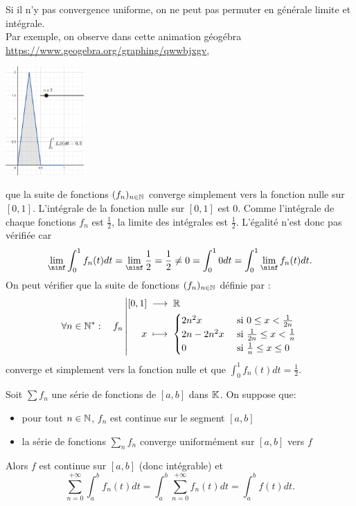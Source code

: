 \documentclass{book}
\newcommand{\fn}{(f_n)_{n\in \N   }}
\newcommand{\Sfn}{\sum f_n}
\begin{document}
\begin{Remarque}
Si il n'y pas convergence uniforme, on ne peut pas permuter en générale limite et intégrale. \\
Par exemple, on observe dans cette animation géogébra \url{https://www.geogebra.org/graphing/qwwbjxgv},
 \begin{center}\includegraphics[width=3cm]{contre_exemple_limite_integrale.png}\end{center} que la suite de fonctions $\fn$ converge simplement vers la fonction nulle sur $[0,1]$. L'intégrale de la fonction nulle sur $[0,1]$ est $0$. Comme l'intégrale de chaque fonctions $f_n$ est $\frac 1 2$, la limite des intégrales est $\frac 1 2$. L'égalité n'est donc pas vérifiée car $$ \lim_\ninf \int_0^1 f_n(t)dt =  \lim_\ninf \frac 1 2 = \frac 1 2 \neq 0  = \int_0^1 0dt= \int_0^1 \lim_\ninf f_n(t)dt.$$
On peut vérifier que la suite de fonctions $\fn$ définie par :
$$\forall n \in \mathbb{N}^* :\quad  {f_n}\left|\begin{aligned}{[0,1]}&\;\longrightarrow\;{\mathbb{R}}\\{x}&\;\longmapsto\;{\begin{cases}2n^2x&\text{ si } 0\leq x < \frac{1}{2n}\\2n-2n^2x&\text{ si } \frac{1}{2n}\leq x < \frac{1}{n}  \\0&\text{ si } \frac{1}{n}\leq x \leq 0 \end{cases}}\end{aligned}\right.$$ converge et simplement vers la fonction nulle et que  $\int_0^1 f_n(t)dt = \frac 1 2$. 
\end{Remarque}
\begin{Theoreme}
Soit $\Sfn$ une série de fonctions de $[a,b]$ dans $\mathbb{K}  $.
On suppose que:
\begin{itemize}
\item
  pour tout $n\in \mathbb{N}   $, $f_n$ est continue sur le segment $[a,b]$
\item
  la série de fonctions $\sum _n f_n$ converge uniformément sur $[a,b]$ vers $f$
\end{itemize}
Alors $f$ est continue sur $[a,b]$ (donc intégrable) et
\[  \sum _{n=0}^{+\infty } \int_a^b f_n(t)dt = \int_a^b \sum _{n=0}^{+\infty } f_n(t)dt= \int_a^b f(t)dt.   \]
\end{Theoreme}
\end{document}
